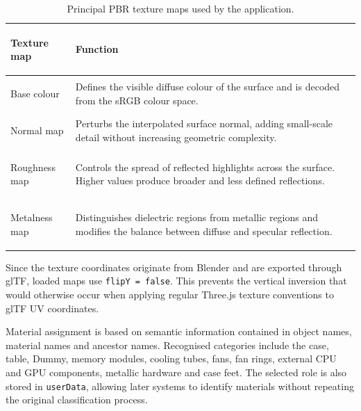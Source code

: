 \documentclass{report}
\begin{document}
\begin{table}[ht]
    \centering
    \small
    \setlength{\tabcolsep}{7pt}
    \renewcommand{\arraystretch}{1.22}

    \begin{tabularx}{\textwidth}{
        @{}
        >{\bfseries\raggedright\arraybackslash}p{}
        >{\raggedright\arraybackslash}X
        @{}
    }
        \toprule
        Texture map & Function \\
        \midrule

        Base colour
        &
        Defines the visible diffuse colour of the surface and is decoded
        from the sRGB colour space.
        \\

        Normal map
        &
        Perturbs the interpolated surface normal, adding small-scale
        detail without increasing geometric complexity.
        \\

        Roughness map
        &
        Controls the spread of reflected highlights across the surface.
        Higher values produce broader and less defined reflections.
        \\

        Metalness map
        &
        Distinguishes dielectric regions from metallic regions and
        modifies the balance between diffuse and specular reflection.
        \\

        \bottomrule
    \end{tabularx}

    \caption{Principal PBR texture maps used by the application.}
    \label{tab:pbr-map-functions}
\end{table}

Since the texture coordinates originate from Blender and are exported
through glTF, loaded maps use \texttt{flipY = false}. This prevents the
vertical inversion that would otherwise occur when applying regular
Three.js texture conventions to glTF UV coordinates.

Material assignment is based on semantic information contained in
object names, material names and ancestor names. Recognised categories
include the case, table, Dummy, memory modules, cooling tubes, fans,
fan rings, external CPU and GPU components, metallic hardware and case
feet. The selected role is also stored in \texttt{userData}, allowing
later systems to identify materials without repeating the original
classification process.
\end{document}

